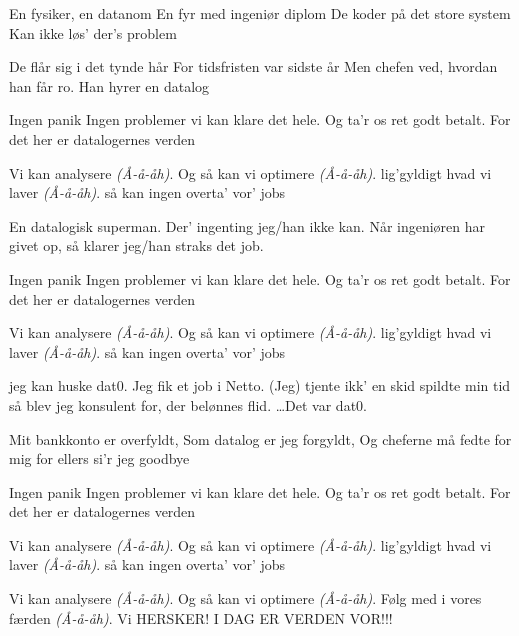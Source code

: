 \documentclass[danish]{article}
\begin{document}
\begin{song}

En fysiker, en datanom
En fyr med ingeniør diplom
De koder på det store system
Kan ikke løs' der's problem

De flår sig i det tynde hår
For tidsfristen var sidste år
Men chefen ved, hvordan han får ro.
Han hyrer en datalog

Ingen panik
Ingen problemer
vi kan klare det hele.
Og ta'r os ret godt betalt.
For det her er datalogernes verden

Vi kan analysere \emph{(Å-å-åh)}.
Og så kan vi optimere \emph{(Å-å-åh)}.
lig'gyldigt hvad vi laver \emph{(Å-å-åh)}.
så kan ingen overta' vor'
jobs


En datalogisk superman.
Der' ingenting jeg/han ikke kan.
Når ingeniøren har givet op,
så klarer jeg/han straks det job.

Ingen panik
Ingen problemer
vi kan klare det hele.
Og ta'r os ret godt betalt.
For det her er datalogernes verden

\newpage
{}Vi kan analysere \emph{(Å-å-åh)}.
Og så kan vi optimere \emph{(Å-å-åh)}.
lig'gyldigt hvad vi laver \emph{(Å-å-åh)}.
så kan ingen overta' vor'
jobs

jeg kan huske dat0.
Jeg fik et job i Netto.
(Jeg) tjente ikk' en skid
spildte min tid
så blev jeg konsulent for, der belønnes flid.
\ldots Det var dat0.

Mit bankkonto er overfyldt,
Som datalog er jeg forgyldt,
Og cheferne må fedte for mig
for ellers si'r jeg goodbye

Ingen panik
Ingen problemer
vi kan klare det hele.
Og ta'r os ret godt betalt.
For det her er datalogernes verden

Vi kan analysere \emph{(Å-å-åh)}.
Og så kan vi optimere \emph{(Å-å-åh)}.
lig'gyldigt hvad vi laver \emph{(Å-å-åh)}.
så kan ingen overta' vor'
jobs

Vi kan analysere \emph{(Å-å-åh)}.
Og så kan vi optimere \emph{(Å-å-åh)}.
Følg med i vores færden \emph{(Å-å-åh)}.
Vi HERSKER! I DAG ER VERDEN
VOR!!!




\end{song}
\end{document}
